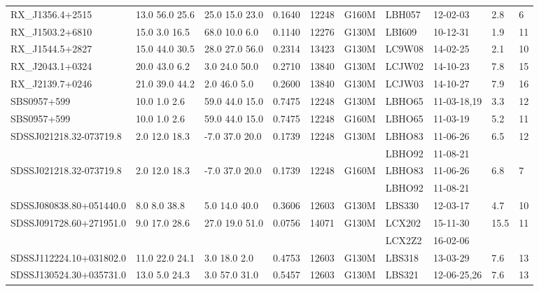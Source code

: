 \documentclass[iop]{emulateapj-rtx4}
\begin{document}
\begin{table}[ht]
\begin{center}
\begin{tabular}{l l l l l l l l l l}
RX\_J1356.4+2515  &   13.0  56.0  25.6  &    25.0  15.0  23.0   &   0.1640  & 12248 		    &   G160M  &   LBH057			& 12-02-03		   &   2.8  &       6          \\
RX\_J1503.2+6810  &     15.0  3.0  16.5  &    68.0  10.0  6.0     &   0.1140  & 12276  		    &   G130M  &   LBI609    		& 10-12-31 		   &   1.9  &      11         \\
RX\_J1544.5+2827  &   15.0  44.0  30.5  &   28.0  27.0  56.0    &   0.2314  & 13423  	            &   G130M  &   LC9W08		& 14-02-25		   &   2.1  &      10         \\
RX\_J2043.1+0324  &     20.0  43.0  6.2  &     3.0  24.0  50.0    &   0.2710  & 13840		    &   G130M  &   LCJW02		& 14-10-23		   &   7.8  &      15         \\
RX\_J2139.7+0246  &   21.0  39.0  44.2  &      2.0  46.0  5.0     &   0.2600  & 13840  		    &   G130M  &   LCJW03		& 14-10-27  		   & 	7.9  &      16         \\
SBS0957+599         &       10.0  1.0  2.6  &     59.0  44.0  15.0  &    0.7475  & 12248  		    &   G130M  &   LBHO65		& 11-03-18,19  		   &   3.3  &      12         \\
SBS0957+599         &       10.0  1.0  2.6  &     59.0  44.0  15.0  &    0.7475  & 12248  		    &   G160M  &   LBHO65		& 11-03-19  		   &   5.2  &      11         \\
SDSSJ021218.32-073719.8  & 2.0  12.0  18.3  &    -7.0  37.0  20.0  &    0.1739  & 12248  	    &   G130M  &   LBHO83		& 11-06-26		   &   6.5  &      12         \\
				        	     & 	  	  	  	&    		  	       &    	  	 & 	  	    &                 &   LBHO92		& 11-08-21		   &          &                   \\
SDSSJ021218.32-073719.8  & 2.0  12.0  18.3  &    -7.0  37.0  20.0  &    0.1739  & 12248      &   G160M  &   LBHO83		& 11-06-26 		   & 	6.8  &       7          \\
				        	     & 	  	  	  	&    		  	       &    	  	 & 	  	    &                 &   LBHO92		& 11-08-21		   &          &                   \\
SDSSJ080838.80+051440.0 &   8.0  8.0  38.8  &     5.0  14.0  40.0  &    0.3606  & 12603	    &   G130M  &   LBS330   		& 12-03-17  		   &   4.7  &      10         \\
SDSSJ091728.60+271951.0 & 9.0  17.0  28.6  &    27.0  19.0  51.0 &    0.0756  & 14071	    &   G130M  &   LCX202			& 15-11-30		   & 15.5  &      11         \\
				        	     & 	  	  	        &    		  	       &    	  	 & 	  	    &                 &   LCX2Z2			& 16-02-06		   &          &                   \\
SDSSJ112224.10+031802.0 & 11.0  22.0  24.1 &     3.0  18.0  2.0    &    0.4753  & 12603      &   G130M  &   LBS318			& 13-03-29		   &   7.6  &      13         \\
SDSSJ130524.30+035731.0 & 13.0  5.0  24.3  &    3.0  57.0  31.0   &    0.5457  & 12603	    &   G130M  &   LBS321			& 12-06-25,26		   &   7.6  &      13         \\


\end{tabular}
\end{center}
\end{table}
\end{document}

